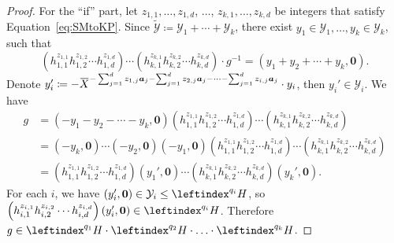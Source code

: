 \documentclass[a4paper,UKenglish,cleveref, autoref, thm-restate]{lipics-v2021}
\newcommand{\mY}{\mathcal{Y}}
\newcommand{\tY}{\widetilde{\mathcal{Y}}}
\newcommand{\ba}{\boldsymbol{a}}
\newcommand{\bzer}{\boldsymbol{0}}
\newcommand{\oX}{\mkern 1.5mu\overline{\mkern-1.5mu X \mkern-1.5mu}\mkern 1.5mu}
\theoremstyle{definition}
\theoremstyle{definition}
\theoremstyle{definition}
\begin{document}
\begin{proof}
    For the ``if'' part, let $z_{1, 1}, \ldots, z_{1, d}$, $\ldots$, $z_{k, 1}, \ldots, z_{k, d}$ be integers that satisfy Equation~\eqref{eq:SMtoKP}. Since $\tY \coloneqq \mY_1 + \cdots + \mY_k$, there exist $y_1 \in \mY_1, \ldots, y_k \in \mY_k$, such that
    \[
    \left(h_{1,1}^{z_{1, 1}} h_{1,2}^{z_{1, 2}} \cdots h_{1,d}^{z_{1, d}}\right) \cdots \left(h_{k,1}^{z_{k, 1}} h_{k,2}^{z_{k, 2}} \cdots h_{k,d}^{z_{k, d}}\right) \cdot g^{-1} = (y_1 + y_2 + \cdots + y_k, \bzer).
    \]
    Denote $y_i' \coloneqq - \oX^{- \sum_{j = 1}^d z_{1, j} \ba_j - \sum_{j = 1}^d z_{2, j} \ba_j - \cdots - \sum_{j = 1}^d z_{i, j} \ba_j} \cdot y_i $, then $y_i' \in \mY_i$. 
    We have
    \begin{align*}
        g & = (- y_1 - y_2 - \cdots - y_k, \bzer) \left(h_{1,1}^{z_{1, 1}} h_{1,2}^{z_{1, 2}} \cdots h_{1,d}^{z_{1, d}}\right) \cdots \left(h_{k,1}^{z_{k, 1}} h_{k,2}^{z_{k, 2}} \cdots h_{k,d}^{z_{k, d}}\right) \\
        & = (- y_k, \bzer) \cdots (- y_2, \bzer) (- y_1, \bzer) \left(h_{1,1}^{z_{1, 1}} h_{1,2}^{z_{1, 2}} \cdots h_{1,d}^{z_{1, d}}\right) \cdots \left(h_{k,1}^{z_{k, 1}} h_{k,2}^{z_{k, 2}} \cdots h_{k,d}^{z_{k, d}}\right) \\
        & = \left(h_{1,1}^{z_{1, 1}} h_{1,2}^{z_{1, 2}} \cdots h_{1,d}^{z_{1, d}}\right) (y_1', \bzer) \cdots \left(h_{k,1}^{z_{k, 1}} h_{k,2}^{z_{k, 2}} \cdots h_{k,d}^{z_{k, d}}\right) (y_k', \bzer).
    \end{align*}
    For each $i$, we have $(y_i', \bzer) \in \mY_i \leq \leftindex^{q_i}{H}$, so $\left(h_{i,1}^{z_{i, 1}} h_{i,2}^{z_{i, 2}} \cdots h_{i,d}^{z_{i, d}}\right) (y_i', \bzer) \in \leftindex^{q_i}{H}$. Therefore $g \in \leftindex^{q_1}{H} \cdot \leftindex^{q_2}{H} \cdot \ldots \cdot \leftindex^{q_{k}}{H}$.
\end{proof}
\end{document}
